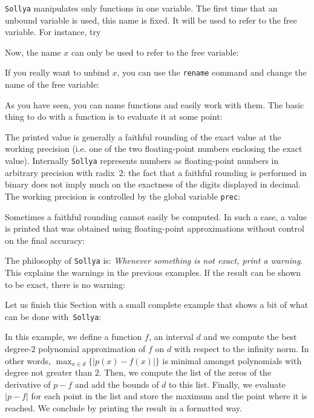 \documentclass[a4paper]{article}
\newcommand{\com}[1]{\texttt{#1}}
\newcommand{\sollya}{\texttt{Sollya}\xspace}
\begin{document}
\sollya manipulates only functions in one variable. The first time that an unbound variable is used, this name is fixed. It will be used to refer to the free variable. For instance, try



Now, the name $x$ can only be used to refer to the free variable:



If you really want to unbind $x$, you can use the \com{rename} command and change the name of the free variable:



As you have seen, you can name functions and easily work with them. The basic thing to do with a function is to evaluate it at some point:



The printed value is generally a faithful rounding of the exact value at the working precision (i.e. one of the two floating-point numbers enclosing the exact value). Internally \sollya represents numbers as floating-point numbers in arbitrary precision with radix~$2$: the fact that a faithful rounding is performed in binary does not imply much on the exactness of the digits displayed in decimal. The working precision is controlled by the global variable \com{prec}:



Sometimes a faithful rounding cannot easily be computed. In such a case, a value is printed that was obtained using floating-point approximations without control on the final accuracy:



The philosophy of \sollya is: \emph{Whenever something is not exact, print a warning}. This explains the warnings in the previous examples. If the result can be shown to be exact, there is no warning:



Let us finish this Section with a small complete example that shows a bit of what can be done with~\sollya:



In this example, we define a function $f$, an interval $d$ and we compute the best degree-2 polynomial approximation of $f$ on $d$ with respect to the infinity norm. In other words, $\max_{x \in d} \{|p(x)-f(x)|\}$ is minimal amongst polynomials with degree not greater than $2$. Then, we compute the list of the zeros of the derivative of $p-f$ and add the bounds of $d$ to this list. Finally, we evaluate $|p-f|$ for each point in the list and store the maximum and the point where it is reached. We conclude by printing the result in a formatted way.
\end{document}
